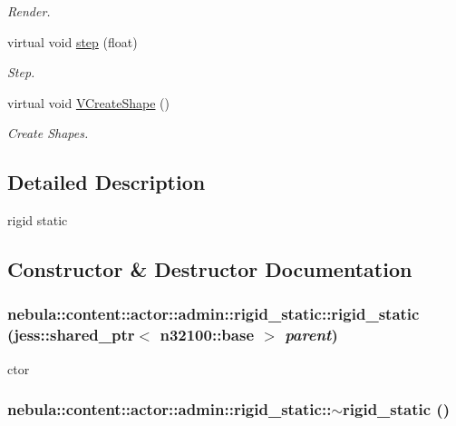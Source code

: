 \begin{DoxyCompactItemize}
\begin{DoxyCompactList}\small\item\em Render. \item\end{DoxyCompactList}\item 
virtual void \hyperlink{classnebula_1_1content_1_1actor_1_1admin_1_1rigid__static_a6f209af8d75aa5159b4a2d75fcf2701a}{step} (float)
\begin{DoxyCompactList}\small\item\em Step. \item\end{DoxyCompactList}\item 
virtual void \hyperlink{classnebula_1_1content_1_1actor_1_1admin_1_1rigid__static_a36052763ad8963027547e7d0bd479849}{VCreateShape} ()
\begin{DoxyCompactList}\small\item\em Create Shapes. \item\end{DoxyCompactList}\end{DoxyCompactItemize}


\subsection{Detailed Description}
rigid static 

\subsection{Constructor \& Destructor Documentation}
\hypertarget{classnebula_1_1content_1_1actor_1_1admin_1_1rigid__static_a3a9f67717f0d7473f17ed0099a2a658f}{
\subsubsection[{rigid\_\-static}]{\setlength{\rightskip}{0pt plus 5cm}nebula::content::actor::admin::rigid\_\-static::rigid\_\-static (jess::shared\_\-ptr$<$ {\bf n32100::base} $>$ {\em parent})}}
\label{classnebula_1_1content_1_1actor_1_1admin_1_1rigid__static_a3a9f67717f0d7473f17ed0099a2a658f}


ctor \hypertarget{classnebula_1_1content_1_1actor_1_1admin_1_1rigid__static_aa75efea896b4c8dede3d36d05b224878}{
\subsubsection[{$\sim$rigid\_\-static}]{\setlength{\rightskip}{0pt plus 5cm}nebula::content::actor::admin::rigid\_\-static::$\sim$rigid\_\-static ()}}
\label{classnebula_1_1content_1_1actor_1_1admin_1_1rigid__static_aa75efea896b4c8dede3d36d05b224878}


